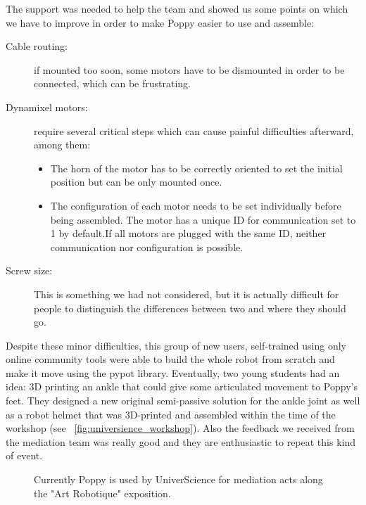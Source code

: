 The support was needed to help the team and showed us some points on which we have to improve in order to make Poppy easier to use and assemble:
\begin{description}
    \item[Cable routing:] if mounted too soon, some motors have to be dismounted in order to be connected, which can be frustrating.
    \item[Dynamixel motors:] require several critical steps which can cause painful difficulties afterward, among them:
    \begin{itemize}
        \item The horn of the motor has to be correctly oriented to set the initial position but can be only mounted once.
        \item The configuration of each motor needs to be set individually before being assembled. The motor has a unique ID for communication set to 1 by default.If all motors are plugged with the same ID, neither communication nor configuration is possible.
    \end{itemize}
    \item[Screw size:] This is something we had not considered, but it is actually difficult for people to distinguish the differences between two and where they should go.
\end{description}

Despite these minor difficulties, this group of new users, self-trained using only online community tools were able to build the whole robot from scratch and make it move using the pypot library. Eventually, two young students  had an idea: 3D printing an ankle that could give some articulated movement to Poppy's feet. They designed a new original semi-passive solution for the ankle joint as well as a robot helmet that was 3D-printed and assembled within the time of the workshop (see \figurename~\ref{fig:universience_workshop}). Also the feedback we received from the mediation team was really good and they are enthusiastic to repeat this kind of event.


\begin{figure}[tb]
\centering
    \hfill
    \caption{Currently Poppy is used by UniverScience for mediation acts along the "Art Robotique" exposition.}
    \label{fig:universcience_art}
\end{figure}

